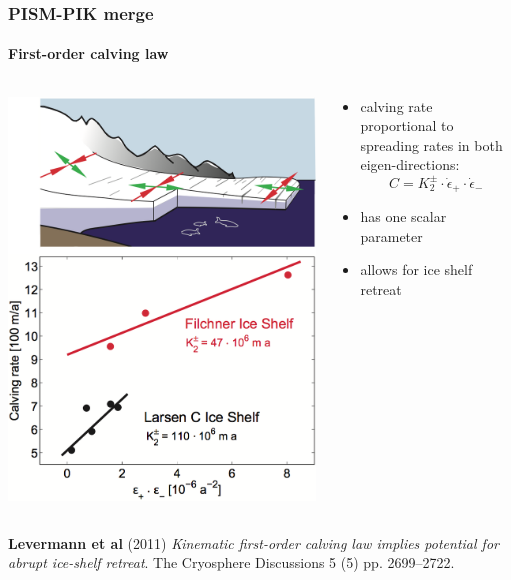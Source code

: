 \documentclass[hide notes,intlimits]{beamer}
\begin{document}
\begin{frame}
  \frametitle{PISM-PIK merge}
  \framesubtitle{First-order calving law}
  \begin{columns}
    \begin{column}{50mm}
      \begin{center}
        \includegraphics[height=0.6\textheight]{calving-law.png}
      \end{center}
    \end{column}
    \begin{column}{70mm}
      \begin{itemize}
      \item calving rate proportional to spreading rates in both
        eigen-directions:
        $$C = K_{2}^{\pm} \cdot \dot \epsilon_{+} \cdot \dot \epsilon_{-}$$
      \item has one scalar parameter
      \item allows for ice shelf retreat
      \end{itemize}
    \end{column}
  \end{columns}
  \begin{flushleft}
    \tiny \textbf{Levermann et al} (2011) \emph{Kinematic
      first-order calving law implies potential for abrupt ice-shelf
      retreat}. The Cryosphere Discussions 5 (5) pp. 2699--2722.
 \end{flushleft}
\end{frame}
\end{document}
